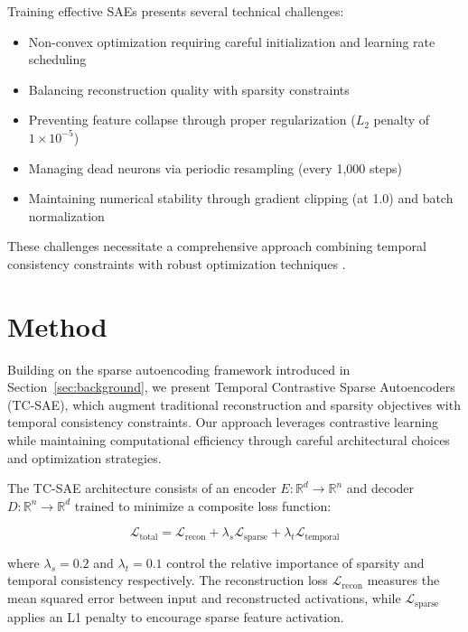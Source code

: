 \documentclass{article} %
\begin{document}
Training effective SAEs presents several technical challenges:
\begin{itemize}
    \item Non-convex optimization requiring careful initialization and learning rate scheduling
    \item Balancing reconstruction quality with sparsity constraints
    \item Preventing feature collapse through proper regularization ($L_2$ penalty of $1\times10^{-5}$)
    \item Managing dead neurons via periodic resampling (every 1,000 steps)
    \item Maintaining numerical stability through gradient clipping (at 1.0) and batch normalization
\end{itemize}

These challenges necessitate a comprehensive approach combining temporal consistency constraints with robust optimization techniques \cite{ba2016layer}.

\section{Method}
\label{sec:method}

Building on the sparse autoencoding framework introduced in Section~\ref{sec:background}, we present Temporal Contrastive Sparse Autoencoders (TC-SAE), which augment traditional reconstruction and sparsity objectives with temporal consistency constraints. Our approach leverages contrastive learning while maintaining computational efficiency through careful architectural choices and optimization strategies.

The TC-SAE architecture consists of an encoder $E\colon \mathbb{R}^d \rightarrow \mathbb{R}^n$ and decoder $D\colon \mathbb{R}^n \rightarrow \mathbb{R}^d$ trained to minimize a composite loss function:

\begin{equation}
    \mathcal{L}_{\text{total}} = \mathcal{L}_{\text{recon}} + \lambda_s\mathcal{L}_{\text{sparse}} + \lambda_t\mathcal{L}_{\text{temporal}}
\end{equation}

where $\lambda_s=0.2$ and $\lambda_t=0.1$ control the relative importance of sparsity and temporal consistency respectively. The reconstruction loss $\mathcal{L}_{\text{recon}}$ measures the mean squared error between input and reconstructed activations, while $\mathcal{L}_{\text{sparse}}$ applies an L1 penalty to encourage sparse feature activation.
\end{document}
